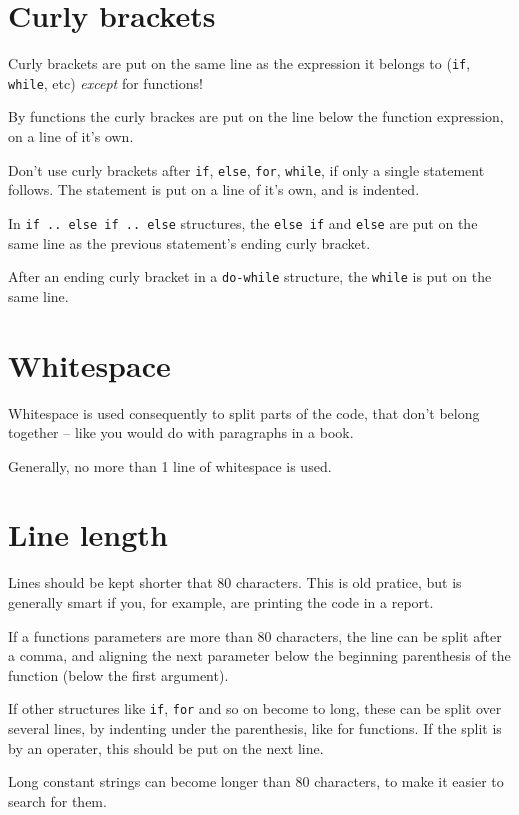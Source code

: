 \documentclass[article, 10pt]{memoir}
\let\tempone\itemize
\let\temptwo\enditemize
\renewenvironment{itemize}{\tempone\firmlist}{\temptwo}
\begin{document}
\begin{multicols}{2}
    \section{Curly brackets}
    \begin{itemize}
    \item Curly brackets are put on the same line as the expression it belongs to (\texttt{if}, \texttt{while}, etc) \emph{except} for functions!
    \item By functions the curly brackes are put on the line below the function expression, on a line of it's own.
    \item Don't use curly brackets after \texttt{if}, \texttt{else}, \texttt{for}, \texttt{while}, if only a single statement follows. The statement is put on a line of it's own, and is indented.
    \item In \texttt{if .. else if .. else} structures, the \texttt{else if} and \texttt{else} are put on the same line as the previous statement's ending curly bracket.
    \item After an ending curly bracket in a \texttt{do-while} structure, the \texttt{while} is put on the same line.
    \end{itemize}

    \section{Whitespace}
    \begin{itemize}
    \item Whitespace is used consequently to split parts of the code, that don't belong together -- like you would do with paragraphs in a book.
    \item Generally, no more than 1 line of whitespace is used.
    \end{itemize}

    \section{Line length}
    \begin{itemize}
    \item Lines should be kept shorter that 80 characters. This is old pratice, but is generally smart if you, for example, are printing the code in a report.
    \item If a functions parameters are more than 80 characters, the line can be split after a comma, and aligning the next parameter below the beginning parenthesis of the function (below the first argument).
    \item If other structures like \texttt{if}, \texttt{for} and so on become to long, these can be split over several lines, by indenting under the parenthesis, like for functions. If the split is by an operater, this should be put on the next line.
    \item Long constant strings can become longer than 80 characters, to make it easier to search for them.
    \end{itemize}


\end{multicols}
\end{document}
